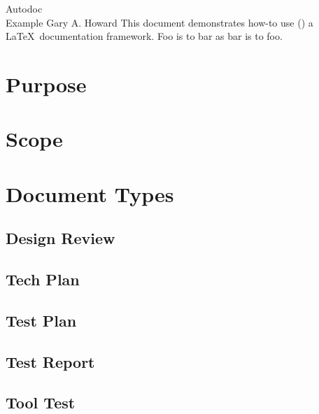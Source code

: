 \documentclass[10pt]{tlc-article}%
\begin{document}
%
  \tlcTitlePageAndTableOfContents%
    {Autodoc \\ Example}%
    {Gary A. Howard}%
    {This document demonstrates how-to use (\skAutoDoc) a \LaTeX\ documentation
     framework.  Foo is to bar as bar is to foo.}%
\section{Purpose}
%
\section{Scope}
%
\section{Document Types}
%
\subsection{Design Review}
%
\subsection{Tech Plan}
%
\subsection{Test Plan}
%
\subsection{Test Report}
%
\subsection{Tool Test}
%
\end{document}
